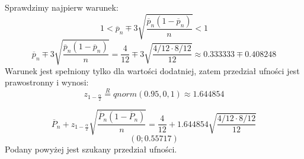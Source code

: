 \documentclass{article}
\begin{document}
Sprawdzimy najpierw warunek:
\[ 1 < \overline{p}_n \mp 3\sqrt{\frac{\overline{p}_n(1-\overline{p}_n) }{n}} < 1 \]
\[ \overline{p}_n \mp 3\sqrt{\frac{\overline{p}_n(1-\overline{p}_n)}{n} } = \frac{4}{12} \mp 3\sqrt{\frac{4/12\cdot 8/12}{12}} \approx 0.333333 \mp 0.408248 \]
Warunek jest spełniony tylko dla wartości dodatniej, zatem przedział ufności jest prawostronny i wynosi:
\[ z_{1-\frac{\alpha}{2}} \overset{R}{=} qnorm(0.95, 0 ,1) \approx 1.644854\]

\[ \overline{P}_n + z_{1-\frac{\alpha}{2}} \sqrt{\frac{\overline{P}_n(1-\overline{P}_n) }{n}} = \frac{4}{12} + 1.644854 \sqrt{\frac{4/12\cdot 8/12}{12}}\]
\[ (0 ; 0.55717) \]
Podany powyżej jest szukany przedział ufności.
\end{document}
